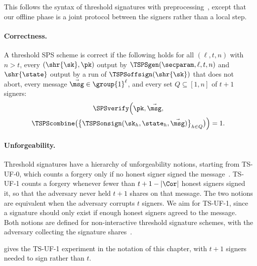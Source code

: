 This follows the syntax of threshold signatures with
preprocessing~\cite{C:BCKMTZ22}, except that our offline phase is a joint
protocol between the signers rather than a local step.

\paragraph{Correctness.} A threshold SPS scheme is correct if the following holds
for all $(\ell, t, n)$ with $n > t$, every $(\shr{\sk}, \pk)$ output by
$\TSPSgen(\secparam, \ell, t, n)$ and $\shr{\state}$ output by a run of
$\TSPSoffsign(\shr{\sk})$ that does not abort, every message $\vec{\msg} \in \group{1}^\ell$, and
every set $Q \subseteq [1,n]$ of $t+1$ signers:
%
\begin{multline*}
%
  \SPSverify\Bigl(\pk, \vec{\msg}, \\
  \TSPScombine\bigl(\bigl\{
\TSPSonsign(\sk_h, \state_h, \vec{\msg}) \bigr\}_{h \in Q}\bigr)\Bigr) = 1.
%
\end{multline*}

\paragraph{Unforgeability.} Threshold signatures have a hierarchy of
unforgeability notions, starting from TS-UF-0, which counts a forgery only if no
honest signer signed the message~\cite{C:BCKMTZ22}. TS-UF-1 counts a forgery
whenever fewer than $t+1-|\Cor|$ honest signers signed it, so that the adversary
never held $t+1$ shares on that message. The two notions are equivalent when the
adversary corrupts $t$ signers. We aim for TS-UF-1, since a signature should only
exist if enough honest signers agreed to the message. Both notions are
defined for non-interactive threshold signature schemes, with the adversary
collecting the signature shares~\cite{C:BCKMTZ22}.

 gives the TS-UF-1 experiment in the notation of this
chapter, with $t+1$ signers needed to sign rather than $t$.

